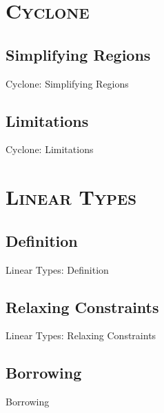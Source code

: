 \documentclass[xcolor=x11names,compress]{beamer}
\renewcommand{\(}{\begin{columns}}
\renewcommand{\)}{\end{columns}}
\newcommand{\<}[1]{\begin{column}{#1}}
\renewcommand{\>}{\end{column}}
\begin{document}
\section{\scshape Cyclone}
\subsection{Simplifying Regions}
\begin{frame}{Cyclone: Simplifying Regions}

\end{frame}

\subsection{Limitations}
\begin{frame}{Cyclone: Limitations}
    
\end{frame}

\section{\scshape Linear Types}
\subsection{Definition}
\begin{frame}{Linear Types: Definition}

\end{frame}

\subsection{Relaxing Constraints}
\begin{frame}{Linear Types: Relaxing Constraints}
    
\end{frame}

\subsection{Borrowing}
\begin{frame}{Borrowing}
    
\end{frame}
\end{document}
